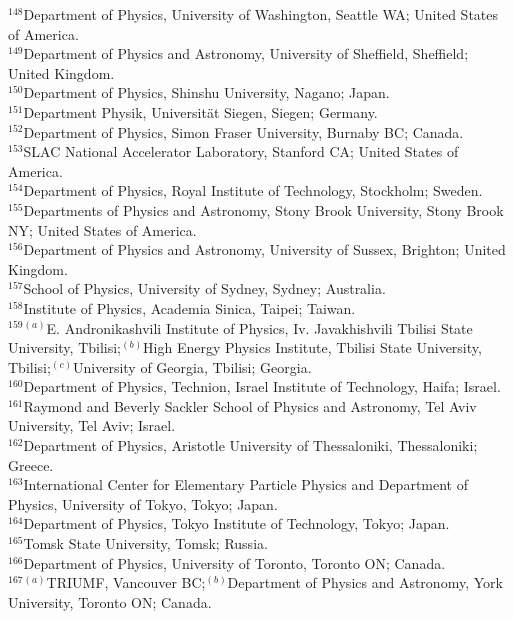 \begin{flushleft}
$^{148}$Department of Physics, University of Washington, Seattle WA; United States of America.\\
$^{149}$Department of Physics and Astronomy, University of Sheffield, Sheffield; United Kingdom.\\
$^{150}$Department of Physics, Shinshu University, Nagano; Japan.\\
$^{151}$Department Physik, Universit\"{a}t Siegen, Siegen; Germany.\\
$^{152}$Department of Physics, Simon Fraser University, Burnaby BC; Canada.\\
$^{153}$SLAC National Accelerator Laboratory, Stanford CA; United States of America.\\
$^{154}$Department of Physics, Royal Institute of Technology, Stockholm; Sweden.\\
$^{155}$Departments of Physics and Astronomy, Stony Brook University, Stony Brook NY; United States of America.\\
$^{156}$Department of Physics and Astronomy, University of Sussex, Brighton; United Kingdom.\\
$^{157}$School of Physics, University of Sydney, Sydney; Australia.\\
$^{158}$Institute of Physics, Academia Sinica, Taipei; Taiwan.\\
$^{159}$$^{(a)}$E. Andronikashvili Institute of Physics, Iv. Javakhishvili Tbilisi State University, Tbilisi;$^{(b)}$High Energy Physics Institute, Tbilisi State University, Tbilisi;$^{(c)}$University of Georgia, Tbilisi; Georgia.\\
$^{160}$Department of Physics, Technion, Israel Institute of Technology, Haifa; Israel.\\
$^{161}$Raymond and Beverly Sackler School of Physics and Astronomy, Tel Aviv University, Tel Aviv; Israel.\\
$^{162}$Department of Physics, Aristotle University of Thessaloniki, Thessaloniki; Greece.\\
$^{163}$International Center for Elementary Particle Physics and Department of Physics, University of Tokyo, Tokyo; Japan.\\
$^{164}$Department of Physics, Tokyo Institute of Technology, Tokyo; Japan.\\
$^{165}$Tomsk State University, Tomsk; Russia.\\
$^{166}$Department of Physics, University of Toronto, Toronto ON; Canada.\\
$^{167}$$^{(a)}$TRIUMF, Vancouver BC;$^{(b)}$Department of Physics and Astronomy, York University, Toronto ON; Canada.\\

\end{flushleft}
